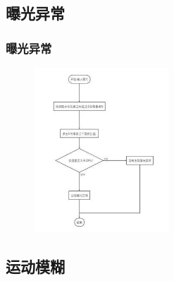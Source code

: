 \documentclass{beamer}
\begin{document}
\subsection{曝光异常}



\begin{frame}
  \frametitle{曝光异常}
        \begin{figure}[h]
    \centering
    \includegraphics[width=0.45\textwidth]{2.jpg}
    \end{figure}
\end{frame}
\subsection{运动模糊}
\end{document}
